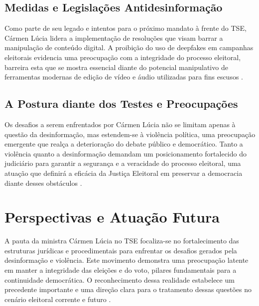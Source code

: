 \documentclass[
   article,       
   12pt,          
   oneside,       
   a4paper,       
   english,       
   brazil,        
   sumario=tradicional
   ]{abntex2}
\begin{document}
\subsection{Medidas e Legislações Antidesinformação}
Como parte de seu legado e intentos para o próximo mandato à frente do TSE, Cármen Lúcia lidera a implementação de resoluções que visam barrar a manipulação de conteúdo digital. A proibição do uso de deepfakes em campanhas eleitorais evidencia uma preocupação com a integridade do processo eleitoral, barreira esta que se mostra essencial diante do potencial manipulativo de ferramentas modernas de edição de vídeo e áudio utilizadas para fins escusos \cite{Mendonca_e_o_unico_ministro_do_STF_a_faltar_a}.

\subsection{A Postura diante dos Testes e Preocupações}
Os desafios a serem enfrentados por Cármen Lúcia não se limitam apenas à questão da desinformação, mas estendem-se à violência política, uma preocupação emergente que realça a deterioração do debate público e democrático. Tanto a violência quanto a desinformação demandam um posicionamento fortalecido do judiciário para garantir a segurança e a veracidade do processo eleitoral, uma atuação que definirá a eficácia da Justiça Eleitoral em preservar a democracia diante desses obstáculos \cite{Pacheco_participa_da_posse_na_Carmen_Lucia_na}.

\section{Perspectivas e Atuação Futura}
A pauta da ministra Cármen Lúcia no TSE focaliza-se no fortalecimento das estruturas jurídicas e procedimentais para enfrentar os desafios gerados pela desinformação e violência. Este movimento demonstra uma preocupação latente em manter a integridade das eleições e do voto, pilares fundamentais para a continuidade democrática. O reconhecimento dessa realidade estabelece um precedente importante e uma direção clara para o tratamento dessas questões no cenário eleitoral corrente e futuro \cite{As_duas_preocupacoes_que_rondam_Carmen_Lucia_}.
\end{document}
